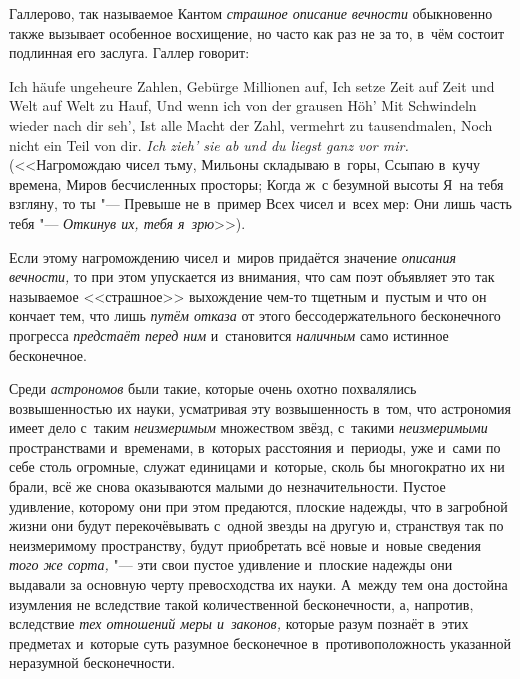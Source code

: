 Галлерово, так называемое Кантом {\em страшное описание вечности} обыкновенно
также вызывает особенное восхищение, но часто как раз не за то, в~чём состоит
подлинная его заслуга. Галлер говорит:

\begin{poem}{\footnotesize
Ich häufe ungeheure Zahlen, \verseline
Gebürge Millionen auf, \verseline
Ich setze Zeit auf Zeit und Welt auf Welt zu Hauf, \verseline
Und wenn ich von der grausen Höh' \verseline
Mit Schwindeln wieder nach dir seh', \verseline
Ist alle Macht der Zahl, vermehrt zu tausendmalen, \verseline
Noch nicht ein Teil von dir. \verseline
{\em Ich zieh' sie ab und du liegst ganz vor mir.} \verseline
\ \verseline}
(<<Нагромождаю чисел тьму, \verseline
Мильоны складываю в~горы, \verseline
Ссыпаю в~кучу времена, \verseline
Миров бесчисленных просторы; \verseline
Когда ж~с безумной высоты \verseline
Я~на тебя взгляну, то ты "--- \verseline
Превыше не в~пример \verseline
Всех чисел и~всех мер: \verseline
Они лишь часть тебя "--- \verseline
{\em Откинув их, тебя я~зрю}>>).
\end{poem}

Если этому нагромождению чисел и~миров придаётся значение
{\em описания вечности,} то при этом упускается из внимания, что сам поэт
объявляет это так называемое <<страшное>> выхождение чем-то тщетным и~пустым и
что он кончает тем, что лишь {\em путём отказа} от этого бессодержательного
бесконечного прогресса {\em предстаёт перед ним} и~становится {\em наличным}
само истинное бесконечное.

Среди {\em астрономов} были такие, которые очень охотно похвалялись
возвышенностью их науки, усматривая эту возвышенность в~том, что астрономия
имеет дело с~таким {\em неизмеримым} множеством звёзд, с~такими
{\em неизмеримыми} пространствами и~временами, в~которых расстояния и~периоды,
уже и~сами по себе столь огромные, служат единицами и~которые, сколь бы
многократно их ни брали, всё же снова оказываются малыми до незначительности.
Пустое удивление, которому они при этом предаются, плоские надежды, что в
загробной жизни они будут перекочёвывать с~одной звезды на другую и, странствуя
так по неизмеримому пространству, будут приобретать всё новые и~новые сведения
{\em того же сорта,} "--- эти свои пустое удивление и~плоские надежды они
выдавали за основную черту превосходства их науки. А~между тем она достойна
изумления не вследствие такой количественной бесконечности, а, напротив,
вследствие {\em тех отношений меры и~законов,} которые разум познаёт в~этих
предметах и~которые суть разумное бесконечное в~противоположность указанной
неразумной бесконечности.

